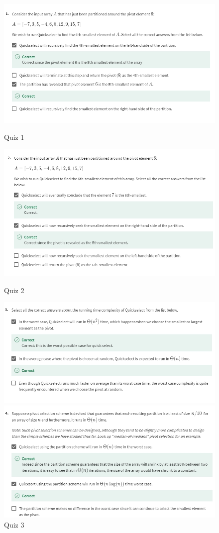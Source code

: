 \documentclass{article}
\begin{document}
\begin{figure}[H]
    \includegraphics[width=\textwidth]{quickselectquiz1.png}
    \caption{Quiz 1\\}
    \includegraphics[width=\textwidth]{quickselectquiz2.png}
    \caption{Quiz 2\\}
    \includegraphics[width=\textwidth]{quickselectquiz3.png}
    \caption{Quiz 3\\}
    \includegraphics[width=\textwidth]{quickselectquiz4.png}

\end{figure}
\end{document}
